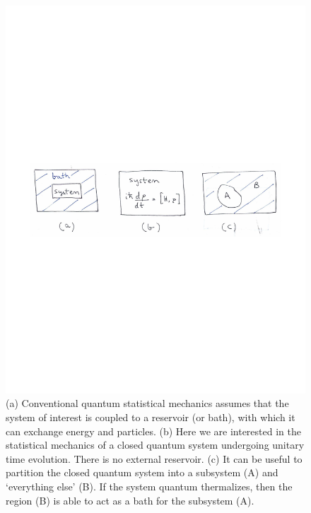 \documentclass[amsmath,onecolumn, superscriptaddress,preprint,aps]{revtex4}
\begin{document}
\begin{figure}
\includegraphics{FIg2}
\caption{\label{fig2} (a) Conventional quantum statistical mechanics assumes that the system of interest is coupled to a reservoir (or bath), with which it can exchange energy and particles. (b) Here we are interested in the statistical mechanics of a closed quantum system undergoing unitary time evolution. There is no external reservoir. (c) It can be useful to partition the closed quantum system into a subsystem (A) and `everything else' (B). If the system quantum thermalizes, then the region (B) is able to act as a bath for the subsystem (A).}
\end{figure}
\end{document}

